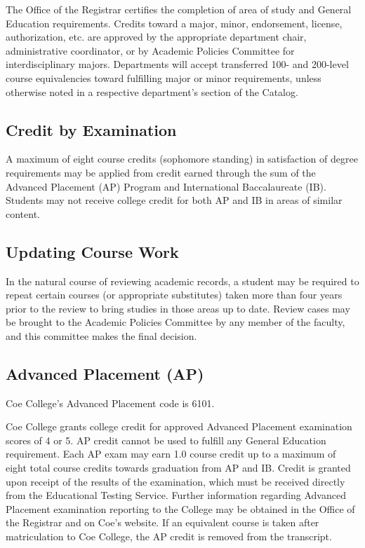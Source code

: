 \documentclass[
  letterpaper,
]{scrbook}
\begin{document}
The Office of the Registrar certifies the completion of area of study
and General Education requirements. Credits toward a major, minor,
endorsement, license, authorization, etc. are approved by the
appropriate department chair, administrative coordinator, or by Academic
Policies Committee for interdisciplinary majors. Departments will accept
transferred 100- and 200-level course equivalencies toward fulfilling
major or minor requirements, unless otherwise noted in a respective
department's section of the Catalog.

\subsection{Credit by Examination}\label{credit-by-examination}

A maximum of eight course credits (sophomore standing) in satisfaction
of degree requirements may be applied from credit earned through the sum
of the Advanced Placement (AP) Program and International Baccalaureate
(IB). Students may not receive college credit for both AP and IB in
areas of similar content.

\subsection{Updating Course Work}\label{updating-course-work}

In the natural course of reviewing academic records, a student may be
required to repeat certain courses (or appropriate substitutes) taken
more than four years prior to the review to bring studies in those areas
up to date. Review cases may be brought to the Academic Policies
Committee by any member of the faculty, and this committee makes the
final decision.

\subsection{Advanced Placement (AP)}\label{advanced-placement-ap}

Coe College's Advanced Placement code is 6101.

Coe College grants college credit for approved Advanced Placement
examination scores of 4 or 5. AP credit cannot be used to fulfill any
General Education requirement. Each AP exam may earn 1.0 course credit
up to a maximum of eight total course credits towards graduation from AP
and IB. Credit is granted upon receipt of the results of the
examination, which must be received directly from the Educational
Testing Service. Further information regarding Advanced Placement
examination reporting to the College may be obtained in the Office of
the Registrar and on Coe's website. If an equivalent course is taken
after matriculation to Coe College, the AP credit is removed from the
transcript.
\end{document}
